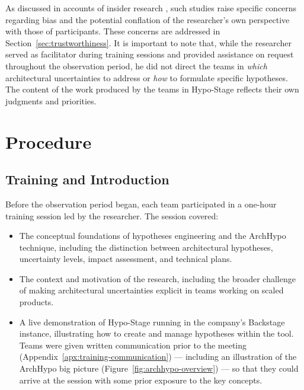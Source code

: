 As discussed in accounts of insider research \citep{robson2016}, such studies raise specific concerns
regarding bias and the potential conflation of the researcher's own perspective with
those of participants. These concerns are addressed in
Section~\ref{sec:trustworthiness}. It is important to note that, while the researcher
served as facilitator during training sessions and provided assistance on request
throughout the observation period, he did not direct the teams in \emph{which}
architectural uncertainties to address or \emph{how} to formulate specific
hypotheses. The content of the work produced by the teams in Hypo-Stage reflects
their own judgments and priorities.

\section{Procedure}
\label{sec:procedure}

\subsection{Training and Introduction}

Before the observation period began, each team participated in a one-hour training
session led by the researcher. The session covered:

\begin{itemize}
  \item[(i)] The conceptual foundations of hypotheses engineering and the ArchHypo technique, including the distinction between architectural hypotheses, uncertainty levels, impact assessment, and technical plans.
  \item[(ii)] The context and motivation of the research, including the broader challenge of making architectural uncertainties explicit in teams working on scaled products.
  \item[(iii)] A live demonstration of Hypo-Stage running in the company's Backstage instance, illustrating how to create and manage hypotheses within the tool. Teams were given written communication prior to the meeting (Appendix~\ref{apx:training-communication}) --- including an illustration of the ArchHypo big picture (Figure~\ref{fig:archhypo-overview}) --- so that they could arrive at the session with some prior exposure to the key concepts.
\end{itemize}

